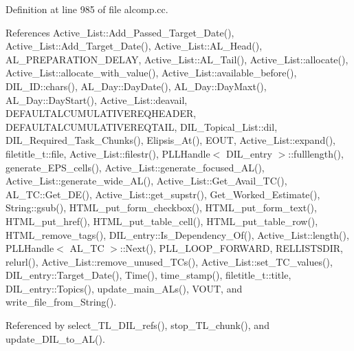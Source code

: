 Definition at line 985 of file alcomp.cc.

References Active\_\-List::Add\_\-Passed\_\-Target\_\-Date(), Active\_\-List::Add\_\-Target\_\-Date(), Active\_\-List::AL\_\-Head(), AL\_\-PREPARATION\_\-DELAY, Active\_\-List::AL\_\-Tail(), Active\_\-List::allocate(), Active\_\-List::allocate\_\-with\_\-value(), Active\_\-List::available\_\-before(), DIL\_\-ID::chars(), AL\_\-Day::Day\-Date(), AL\_\-Day::Day\-Maxt(), AL\_\-Day::Day\-Start(), Active\_\-List::deavail, DEFAULTALCUMULATIVEREQHEADER, DEFAULTALCUMULATIVEREQTAIL, DIL\_\-Topical\_\-List::dil, DIL\_\-Required\_\-Task\_\-Chunks(), Elipsis\_\-At(), EOUT, Active\_\-List::expand(), filetitle\_\-t::file, Active\_\-List::filestr(), PLLHandle$<$ DIL\_\-entry $>$::fulllength(), generate\_\-EPS\_\-cells(), Active\_\-List::generate\_\-focused\_\-AL(), Active\_\-List::generate\_\-wide\_\-AL(), Active\_\-List::Get\_\-Avail\_\-TC(), AL\_\-TC::Get\_\-DE(), Active\_\-List::get\_\-supstr(), Get\_\-Worked\_\-Estimate(), String::gsub(), HTML\_\-put\_\-form\_\-checkbox(), HTML\_\-put\_\-form\_\-text(), HTML\_\-put\_\-href(), HTML\_\-put\_\-table\_\-cell(), HTML\_\-put\_\-table\_\-row(), HTML\_\-remove\_\-tags(), DIL\_\-entry::Is\_\-Dependency\_\-Of(), Active\_\-List::length(), PLLHandle$<$ AL\_\-TC $>$::Next(), PLL\_\-LOOP\_\-FORWARD, RELLISTSDIR, relurl(), Active\_\-List::remove\_\-unused\_\-TCs(), Active\_\-List::set\_\-TC\_\-values(), DIL\_\-entry::Target\_\-Date(), Time(), time\_\-stamp(), filetitle\_\-t::title, DIL\_\-entry::Topics(), update\_\-main\_\-ALs(), VOUT, and write\_\-file\_\-from\_\-String().

Referenced by select\_\-TL\_\-DIL\_\-refs(), stop\_\-TL\_\-chunk(), and update\_\-DIL\_\-to\_\-AL().



